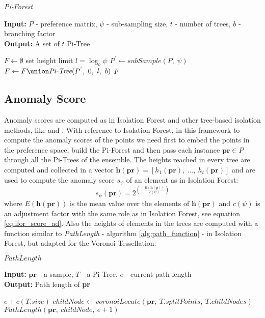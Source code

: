 \begin{algorithm}[h]
    \caption{\textit{Pi-Forest}}
    \label{alg:piforest}
    \textbf{Input:} $P$ - preference matrix, $\psi$ - sub-sampling size, $t$ - number of trees, $b$ - branching factor\\
    \textbf{Output:} A set of $t$ Pi-Tree
    \begin{algorithmic}[1]
        \State $F \gets \emptyset$
        \State set height limit $l = \log_b \psi$
            \State $P^{'} \gets subSample(P,\ \psi)$
            \State $F \gets F \union \textit{Pi-Tree}(P^{'},\ 0,\ l,\ b)$
        \EndFor
        \State \Return $F$
    \end{algorithmic}
\end{algorithm}

\subsection{Anomaly Score}
Anomaly scores are computed as in Isolation Forest and other tree-based isolation methods, like \cite{isolation_anomal} and \cite{novel_anomal_score}. With reference to Isolation Forest, in this framework to compute the anomaly scores of the points we need first to embed the points in the preference space, build the Pi-Forest and then pass each instance $\textbf{pr} \in P$ through all the Pi-Trees of the ensemble. The heights reached in every tree are computed and collected in a vector $\textbf{h}(\textbf{pr}) = [h_1(\textbf{pr}),\ ...,\ h_t(\textbf{pr})]$ and are used to compute the anomaly score $s_\psi$ of an element as in Isolation Forest:
\begin{equation}
    s_\psi(\textbf{pr}) = 2^{\displaystyle \left ( - \frac{E(\textbf{h}(\textbf{p}))}{c(\psi)} \right )}
\end{equation}
where $E(\textbf{h}(\textbf{pr}))$ is the mean value over the elements of $\textbf{h}(\textbf{pr})$ and $c(\psi)$ is an adjustment factor with the same role as in Isolation Forest, see equation \ref{eq:ifor_score_ad}. \newline
Also the heights of elements in the trees are computed with a function similar to \textit{PathLength} - algorithm \ref{alg:path_function} - in Isolation Forest, but adapted for the Voronoi Tessellation:

\begin{algorithm}[h]
    \caption{$PathLength$}
    \label{alg:pathlength_pif}
    \textbf{Input:} $\textbf{pr}$ - a sample, $T$ - a Pi-Tree, $e$ - current path length \\
    \textbf{Output:} Path length of \textbf{pr}
    \begin{algorithmic}[1]
            \State \Return $e + c(T.size)$
        \EndIf
        \State $childNode \gets voronoiLocate(\textbf{pr},\ T.splitPoints,\ T.childNodes)$
        \State \Return $PathLength(\textbf{pr},\ childNode,\ e+1)$
    \end{algorithmic}
\end{algorithm}


